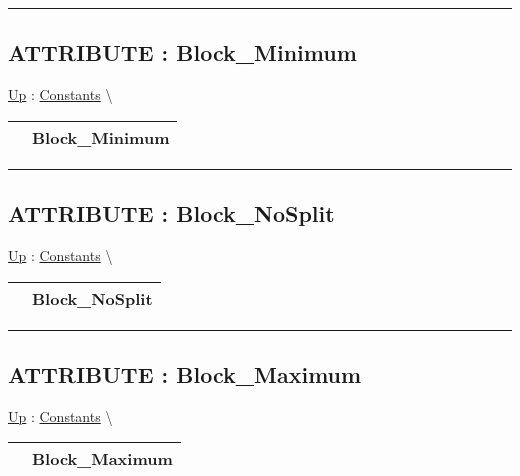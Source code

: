 \rule{\linewidth}{0.5pt}

\subsection*{ATTRIBUTE : Block\_Minimum}
\hypertarget{ecldoc:pbblas.constants.block_minimum}{}
\hyperlink{ecldoc:PBblas.Constants}{Up} :
\hspace{0pt} \hyperlink{ecldoc:PBblas.Constants}{Constants} \textbackslash 

{\renewcommand{\arraystretch}{1.5}
\begin{tabularx}{\textwidth}{|>{\raggedright\arraybackslash}l|X|}
\hline
\hspace{0pt} & Block\_Minimum \\
\hline
\end{tabularx}
}

\par


\rule{\linewidth}{0.5pt}
\subsection*{ATTRIBUTE : Block\_NoSplit}
\hypertarget{ecldoc:pbblas.constants.block_nosplit}{}
\hyperlink{ecldoc:PBblas.Constants}{Up} :
\hspace{0pt} \hyperlink{ecldoc:PBblas.Constants}{Constants} \textbackslash 

{\renewcommand{\arraystretch}{1.5}
\begin{tabularx}{\textwidth}{|>{\raggedright\arraybackslash}l|X|}
\hline
\hspace{0pt} & Block\_NoSplit \\
\hline
\end{tabularx}
}

\par


\rule{\linewidth}{0.5pt}
\subsection*{ATTRIBUTE : Block\_Maximum}
\hypertarget{ecldoc:pbblas.constants.block_maximum}{}
\hyperlink{ecldoc:PBblas.Constants}{Up} :
\hspace{0pt} \hyperlink{ecldoc:PBblas.Constants}{Constants} \textbackslash 

{\renewcommand{\arraystretch}{1.5}
\begin{tabularx}{\textwidth}{|>{\raggedright\arraybackslash}l|X|}
\hline
\hspace{0pt} & Block\_Maximum \\
\hline
\end{tabularx}
}

